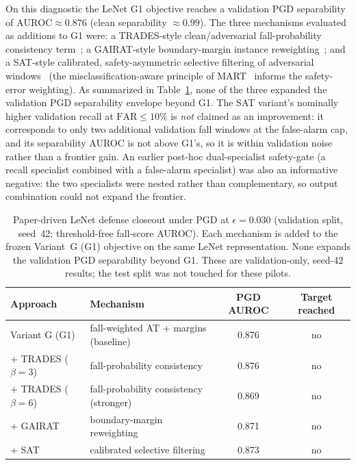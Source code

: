 On this diagnostic the LeNet G1 objective reaches a validation PGD separability of
\(\mathrm{AUROC}\approx 0.876\) (clean separability \(\approx 0.99\)). The three mechanisms evaluated as
additions to G1 were: a TRADES-style clean/adversarial fall-probability consistency
term~\cite{zhang2019trades}; a GAIRAT-style boundary-margin instance reweighting~\cite{zhang2021gairat};
and a SAT-style calibrated, safety-asymmetric selective filtering of adversarial windows~\cite{pan2024sat}
(the misclassification-aware principle of MART~\cite{wang2020mart} informs the safety-error weighting). As
summarized in Table~\ref{tab:ch6-paper-driven-closeout}, none of the three expanded the validation PGD
separability envelope beyond G1. The SAT variant's nominally higher validation recall at
\(\mathrm{FAR}\leq 10\%\) is \emph{not} claimed as an improvement: it corresponds to only two additional
validation fall windows at the false-alarm cap, and its separability AUROC is not above G1's, so it is
within validation noise rather than a frontier gain. An earlier post-hoc dual-specialist safety-gate
(a recall specialist combined with a false-alarm specialist) was also an informative negative: the two
specialists were nested rather than complementary, so output combination could not expand the frontier.

\begin{table}[H]
\centering
\small
\caption{Paper-driven LeNet defense closeout under PGD at \(\epsilon=0.030\) (validation split, seed~42;
threshold-free fall-score AUROC). Each mechanism is added to the frozen Variant~G (G1) objective on the same
LeNet representation. None expands the validation PGD separability beyond G1. These are validation-only,
seed-42 results; the test split was not touched for these pilots.}
\label{tab:ch6-paper-driven-closeout}
\begin{tabular}{p{}p{}cc}
\hline
Approach & Mechanism & PGD AUROC & Target reached \\
\hline
Variant G (G1) & fall-weighted AT + margins (baseline) & 0.876 & no \\
+ TRADES (\(\beta=3\)) & fall-probability consistency & 0.876 & no \\
+ TRADES (\(\beta=6\)) & fall-probability consistency (stronger) & 0.869 & no \\
+ GAIRAT & boundary-margin reweighting & 0.871 & no \\
+ SAT & calibrated selective filtering & 0.873 & no \\
\hline
\end{tabular}
\end{table}

